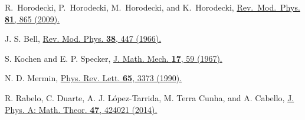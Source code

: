 \documentclass[prl,letterpaper,english,reprint,nofootinbib,aps,superscriptaddress,showpacs,showkeys]{revtex4-1}
\theoremstyle{definition}
\theoremstyle{remark}
\begin{document}
\begin{thebibliography}{10}

R.~Horodecki, P.~Horodecki, M.~Horodecki, and K.~Horodecki,
 \href{https://journals.aps.org/rmp/pdf/10.1103/RevModPhys.81.865}
 {Rev.~Mod.~Phys. \textbf{81}, 865 (2009).}


 J. S. Bell,
 \href{http://rmp.aps.org/abstract/RMP/v38/i3/p447_1}{Rev. Mod. Phys. \textbf{38}, 447 (1966).}


 S. Kochen and E. P. Specker,
 \href{http://www.iumj.indiana.edu/IUMJ/fulltext.php?year=1968&volume=17&artid=17004}{J. Math. Mech. \textbf{17}, 59 (1967).}


N. D. Mermin,
\href{https://journals.aps.org/prl/pdf/10.1103/PhysRevLett.65.3373}
{Phys. Rev. Lett. \textbf{65}, 3373 (1990).}

 R. Rabelo, C. Duarte, A. J. L\'opez-Tarrida, M. Terra Cunha, and A. Cabello,
 \href{https://iopscience.iop.org/article/10.1088/1751-8113/47/42/424021/meta}
 {J. Phys. A: Math. Theor. \textbf{47}, 424021 (2014).}






%
%
%




\end{thebibliography}
\end{document}
